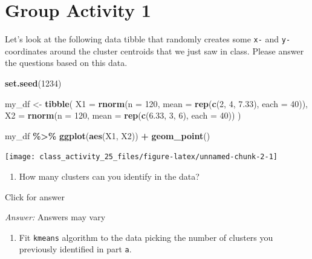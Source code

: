 \documentclass[
]{book}
\newenvironment{Shaded}{\begin{snugshade}}{\end{snugshade}}
\newcommand{\AttributeTok}[1]{\textcolor[rgb]{0.13,0.29,0.53}{#1}}
\newcommand{\DecValTok}[1]{\textcolor[rgb]{0.00,0.00,0.81}{#1}}
\newcommand{\FloatTok}[1]{\textcolor[rgb]{0.00,0.00,0.81}{#1}}
\newcommand{\FunctionTok}[1]{\textcolor[rgb]{0.13,0.29,0.53}{\textbf{#1}}}
\newcommand{\NormalTok}[1]{#1}
\newcommand{\OtherTok}[1]{\textcolor[rgb]{0.56,0.35,0.01}{#1}}
\newcommand{\SpecialCharTok}[1]{\textcolor[rgb]{0.81,0.36,0.00}{\textbf{#1}}}
\providecommand{\tightlist}{%
  \setlength{\itemsep}{0pt}\setlength{\parskip}{0pt}}
\begin{document}
\hypertarget{group-activity-1-10}{%
\section{Group Activity 1}\label{group-activity-1-10}}

Let's look at the following data tibble that randomly creates some \texttt{x-} and \texttt{y-} coordinates around the cluster centroids that we just saw in class. Please answer the questions based on this data.

\begin{Shaded}
\begin{Highlighting}[]
\FunctionTok{set.seed}\NormalTok{(}\DecValTok{1234}\NormalTok{)}

\NormalTok{my\_df }\OtherTok{\textless{}{-}} \FunctionTok{tibble}\NormalTok{(}
  \AttributeTok{X1 =} \FunctionTok{rnorm}\NormalTok{(}\AttributeTok{n =} \DecValTok{120}\NormalTok{, }\AttributeTok{mean =} \FunctionTok{rep}\NormalTok{(}\FunctionTok{c}\NormalTok{(}\DecValTok{2}\NormalTok{, }\DecValTok{4}\NormalTok{, }\FloatTok{7.33}\NormalTok{), }\AttributeTok{each =} \DecValTok{40}\NormalTok{)),}
  \AttributeTok{X2 =} \FunctionTok{rnorm}\NormalTok{(}\AttributeTok{n =} \DecValTok{120}\NormalTok{, }\AttributeTok{mean =} \FunctionTok{rep}\NormalTok{(}\FunctionTok{c}\NormalTok{(}\FloatTok{6.33}\NormalTok{, }\DecValTok{3}\NormalTok{, }\DecValTok{6}\NormalTok{), }\AttributeTok{each =} \DecValTok{40}\NormalTok{))}
\NormalTok{)}

\NormalTok{my\_df }\SpecialCharTok{\%\textgreater{}\%}
  \FunctionTok{ggplot}\NormalTok{(}\FunctionTok{aes}\NormalTok{(X1, X2)) }\SpecialCharTok{+}
  \FunctionTok{geom\_point}\NormalTok{() }
\end{Highlighting}
\end{Shaded}

\texttt{[image: class\_activity\_25\_files/figure-latex/unnamed-chunk-2-1]}

\begin{enumerate}
\def\labelenumi{\alph{enumi}.}
\tightlist
\item
  How many clusters can you identify in the data?
\end{enumerate}

Click for answer

\emph{Answer:} Answers may vary

\begin{enumerate}
\def\labelenumi{\alph{enumi}.}
\setcounter{enumi}{1}
\tightlist
\item
  Fit \texttt{kmeans} algorithm to the data picking the number of clusters you previously identified in part \texttt{a}.
\end{enumerate}
\end{document}
